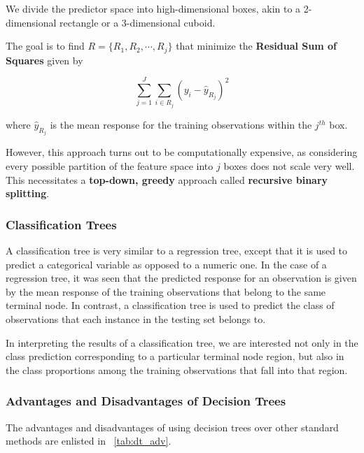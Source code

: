 We divide the predictor space into high-dimensional boxes, akin to a 2-dimensional rectangle or a 3-dimensional cuboid.

The goal is to find $R = \{R_{1}, R_{2}, \cdots,R_{j}\}$ that minimize the \textbf{Residual Sum of Squares} given by

$$
    \sum_{j=1}^{J} \sum_{i \in R_j} (y_i - \hat{y}_{R_j})^2
$$

where $\hat{y}_{R_j}$ is the mean response for the training observations within the $j^{th}$ box.

However, this approach turns out to be computationally expensive, as considering every possible partition of the feature space into $j$ boxes does not scale very well. This necessitates a \textbf{top-down, greedy} approach called \textbf{recursive binary splitting}.


\subsubsection{Classification Trees}

A classification tree is very similar to a regression tree, except that it is used to predict a categorical variable as opposed to a numeric one. In the case of a regression tree, it was seen that the predicted response for an observation is given by the mean response of the training observations that belong to the same terminal node.
In contrast, a classification tree is used to predict the class of observations that each instance in the testing set belongs to.


In interpreting the results of a classification tree, we are interested not only in the class prediction corresponding to a particular terminal node region, but also in the class proportions among the training observations that fall into that region.

\subsubsection{Advantages and Disadvantages of Decision Trees}
The advantages and disadvantages of using decision trees over other standard methods are enlisted in ~\autoref{tab:dt_adv}.

